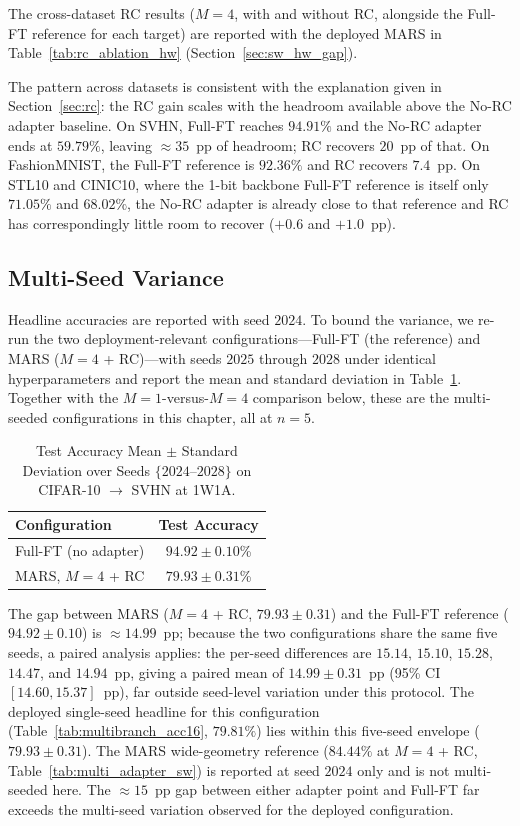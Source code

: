 \documentclass[12pt, a4paper]{report}
\numberwithin{equation}{chapter}
\numberwithin{figure}{chapter}
\numberwithin{table}{chapter}
\numberwithin{algorithm}{chapter}
\begin{document}
The cross-dataset RC results ($M{=}4$, with and without RC, alongside the Full-FT reference for each target) are reported with the deployed MARS in Table~\ref{tab:rc_ablation_hw} (Section~\ref{sec:sw_hw_gap}).

The pattern across datasets is consistent with the explanation given in Section~\ref{sec:rc}: the RC gain scales with the headroom available above the No-RC adapter baseline. On SVHN, Full-FT reaches $94.91\%$ and the No-RC adapter ends at $59.79\%$, leaving $\approx 35$~pp of headroom; RC recovers $20$~pp of that. On FashionMNIST, the Full-FT reference is $92.36\%$ and RC recovers $7.4$~pp. On STL10 and CINIC10, where the 1-bit backbone Full-FT reference is itself only $71.05\%$ and $68.02\%$, the No-RC adapter is already close to that reference and RC has correspondingly little room to recover ($+0.6$ and $+1.0$~pp).

\subsection{Multi-Seed Variance}
\label{sec:rc_multiseed}

Headline accuracies are reported with seed $2024$. To bound the variance, we re-run the two deployment-relevant configurations---Full-FT (the reference) and MARS ($M=4$ + RC)---with seeds $2025$ through $2028$ under identical hyperparameters and report the mean and standard deviation in Table~\ref{tab:multiseed}. Together with the $M{=}1$-versus-$M{=}4$ comparison below, these are the multi-seeded configurations in this chapter, all at $n=5$.

\begin{table}[H]
\centering
\caption{Test Accuracy Mean $\pm$ Standard Deviation over Seeds $\{2024\text{--}2028\}$ on CIFAR-10 $\to$ SVHN at 1W1A.}
\label{tab:multiseed}
\begin{tabular}{lc}
\toprule
\textbf{Configuration} & \textbf{Test Accuracy} \\
\midrule
Full-FT (no adapter)                                              & $94.92 \pm 0.10$\% \\
MARS, $M=4$ + RC                     & $79.93 \pm 0.31$\% \\
\bottomrule
\end{tabular}
\end{table}

The gap between MARS ($M=4$ + RC, $79.93 \pm 0.31$) and the Full-FT reference ($94.92 \pm 0.10$) is $\approx 14.99$~pp; because the two configurations share the same five seeds, a paired analysis applies: the per-seed differences are $15.14$, $15.10$, $15.28$, $14.47$, and $14.94$~pp, giving a paired mean of $14.99 \pm 0.31$~pp (95\% CI $[14.60, 15.37]$~pp), far outside seed-level variation under this protocol. The deployed single-seed headline for this configuration (Table~\ref{tab:multibranch_acc16}, $79.81\%$) lies within this five-seed envelope ($79.93 \pm 0.31$). The MARS wide-geometry reference ($84.44\%$ at $M=4$ + RC, Table~\ref{tab:multi_adapter_sw}) is reported at seed $2024$ only and is not multi-seeded here. The $\approx 15$~pp gap between either adapter point and Full-FT far exceeds the multi-seed variation observed for the deployed configuration.
\end{document}
